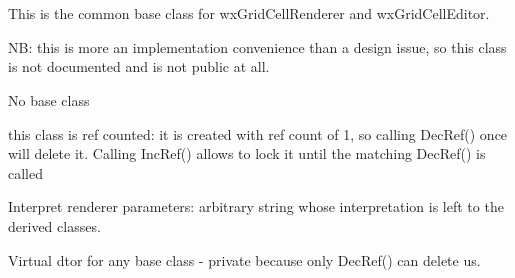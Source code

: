 %
%

\section{}\label{wxgridcellworker}

This is the common base class for wxGridCellRenderer and
wxGridCellEditor.

NB: this is more an implementation convenience than a design issue, so this
class is not documented and is not public at all.


No base class



\label{wxgridcellworkerwxgridcellworker}


\label{wxgridcellworkerincref}


this class is ref counted: it is created with ref count of 1, so
calling DecRef() once will delete it. Calling IncRef() allows to lock
it until the matching DecRef() is called

\label{wxgridcellworkerdecref}


\label{wxgridcellworkersetparameters}


Interpret renderer parameters: arbitrary string whose interpretation is
left to the derived classes.

\label{wxgridcellworkerdtor}


Virtual dtor for any base class - private because only DecRef() can
delete us.

